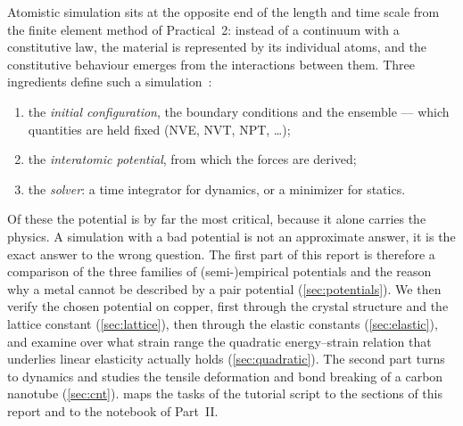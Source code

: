 \documentclass[11pt,a4paper]{article}
\numberwithin{equation}{section}
\theoremstyle{remark}
\begin{document}
Atomistic simulation sits at the opposite end of the length and time scale from the finite element
method of Practical~2: instead of a continuum with a constitutive law, the material is represented by
its individual atoms, and the constitutive behaviour emerges from the interactions between them. Three
ingredients define such a simulation~\citep{script4, allen2017}:
\begin{enumerate}\setlength{\itemsep}{1pt}
  \item the \emph{initial configuration}, the boundary conditions and the ensemble --- which quantities
    are held fixed (NVE, NVT, NPT, \dots);
  \item the \emph{interatomic potential}, from which the forces are derived;
  \item the \emph{solver}: a time integrator for dynamics, or a minimizer for statics.
\end{enumerate}
Of these the potential is by far the most critical, because it alone carries the physics. A simulation
with a bad potential is not an approximate answer, it is the exact answer to the wrong question. The
first part of this report is therefore a comparison of the three families of (semi-)empirical
potentials and the reason why a metal cannot be described by a pair potential
(\cref{sec:potentials}). We then verify the chosen potential on copper, first through the crystal
structure and the lattice constant (\cref{sec:lattice}), then through the elastic constants
(\cref{sec:elastic}), and examine over what strain range the quadratic energy--strain relation that
underlies linear elasticity actually holds (\cref{sec:quadratic}). The second part turns to dynamics
and studies the tensile deformation and bond breaking of a carbon nanotube (\cref{sec:cnt}).
 maps the tasks of the tutorial script to the sections of this report and to the
notebook of Part~II.
\end{document}
